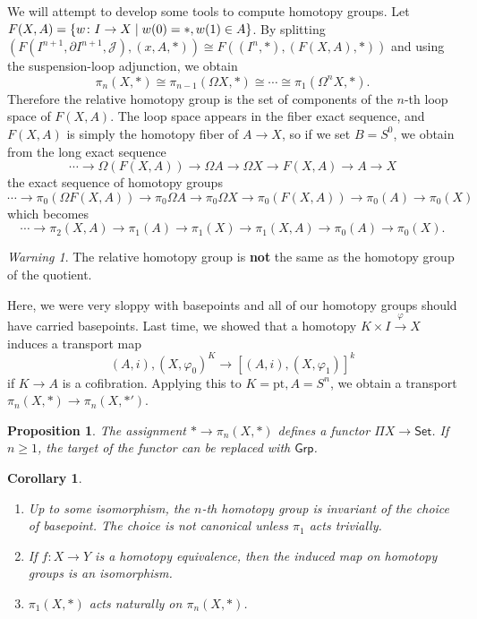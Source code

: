 \documentclass[leqno, openany]{memoir}
\newtheorem{cor}[thm]{Corollary}
\newtheorem{prop}[thm]{Proposition}
\theoremstyle{definition}
\theoremstyle{remark}
\newtheorem{warn}[thm]{Warning}
\theoremstyle{plain}
\theoremstyle{definition}
\theoremstyle{remark}
\newcommand{\mc}[1]{\mathcal{#1}}
\newcommand{\mr}[1]{\mathrm{#1}}
\newcommand{\ms}[1]{\mathsf{#1}}
\begin{document}
We will attempt to develop some tools to compute homotopy groups. Let $F(X,A) =
\qty{w \colon I \to X \mid w(0) = *, w(1) \in A}$. By splitting $(F(I^{n+1},
\partial I^{n+1}, \mc{J}), (x, A, *)) \cong F((I^n, *), (F(X,A), *))$ and using
the suspension-loop adjunction, we obtain \[ \pi_n(X, *) \cong \pi_{n-1}(\Omega
X, *) \cong \cdots \cong \pi_1(\Omega^n X, *). \] Therefore the relative
homotopy group is the set of components of the $n$-th loop space of $F(X,A)$.
The loop space appears in the fiber exact sequence, and $F(X,A)$ is simply the
homotopy fiber of $A \to X$, so if we set $B = S^0$, we obtain from the long
exact sequence \[ \cdots \to \Omega(F(X,A)) \to \Omega A \to \Omega X \to
    F(X,A) \to A \to X \] the exact sequence of homotopy groups \[ \cdots \to
\pi_0(\Omega F(X,A)) \to \pi_0 \Omega A \to \pi_0 \Omega X \to \pi_0(F(X,A))
\to \pi_0(A) \to \pi_0(X) \] which becomes \[ \cdots \to \pi_2(X,A) \to
\pi_1(A) \to \pi_1(X) \to \pi_1(X,A) \to \pi_0(A) \to \pi_0(X). \] \begin{warn}
The relative homotopy group is \textbf{not} the same as the homotopy group of
the quotient.  \end{warn}

Here, we were very sloppy with basepoints and all of our homotopy groups should
have carried basepoints. Last time, we showed that a homotopy $K \times I
\xrightarrow{\varphi} X$ induces a transport map \[ (A, i), (X, \varphi_0)^K
\to [(A,i), (X, \varphi_1)]^k \] if $K \to A$ is a cofibration. Applying this
to $K = \mr{pt}, A = S^n$, we obtain a transport $\pi_n(X, *) \to \pi_n(X,
*')$.

\begin{prop} The assignment $* \to \pi_n(X, *)$ defines a functor $\Pi X \to
\ms{Set}$. If $n \geq 1$, the target of the functor can be replaced with
$\ms{Grp}$.  \end{prop}

\begin{cor} \begin{enumerate} \item Up to some isomorphism, the $n$-th homotopy
    group is invariant of the choice of basepoint. The choice is not canonical
    unless $\pi_1$ acts trivially.  \item If $f \colon X \to Y$ is a homotopy
    equivalence, then the induced map on homotopy groups is an isomorphism.
    \item $\pi_1(X,*)$ acts naturally on $\pi_n(X,*)$.  \end{enumerate}
    \end{cor}
\end{document}
